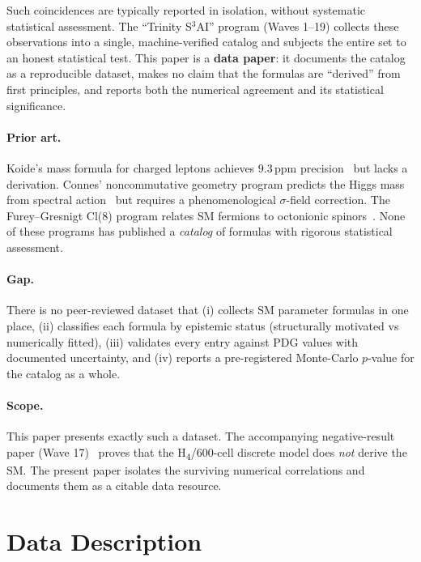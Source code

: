 \documentclass[11pt,a4paper]{article}
\begin{document}
Such coincidences are typically reported in isolation, without systematic
statistical assessment.  The ``Trinity S$^3$AI'' program (Waves 1--19)
collects these observations into a single, machine-verified catalog and
subjects the entire set to an honest statistical test.  This paper is a
\textbf{data paper}: it documents the catalog as a reproducible dataset,
makes no claim that the formulas are ``derived'' from first principles,
and reports both the numerical agreement and its statistical significance.

\paragraph{Prior art.}  Koide's mass formula for charged leptons
achieves $9.3\,\text{ppm}$ precision\ \cite{Koide:1983} but lacks a
derivation.  Connes' noncommutative geometry program predicts the Higgs
mass from spectral action\ \cite{Connes:2006} but requires a
phenomenological $\sigma$-field correction.  The Furey--Gresnigt
Cl(8) program relates SM fermions to octonionic spinors\ \cite{Furey:2015}.
None of these programs has published a \emph{catalog} of formulas with
rigorous statistical assessment.

\paragraph{Gap.}  There is no peer-reviewed dataset that (i) collects
SM parameter formulas in one place, (ii) classifies each formula by
epistemic status (structurally motivated vs numerically fitted), (iii)
validates every entry against PDG values with documented uncertainty,
and (iv) reports a pre-registered Monte-Carlo $p$-value for the catalog
as a whole.

\paragraph{Scope.}  This paper presents exactly such a dataset.  The
accompanying negative-result paper (Wave 17)\ \cite{TrinityWave17} proves
that the H\textsubscript{4}/600-cell discrete model does \emph{not}
derive the SM.  The present paper isolates the surviving numerical
correlations and documents them as a citable data resource.


\section{Data Description}
\label{sec:data}
\end{document}
